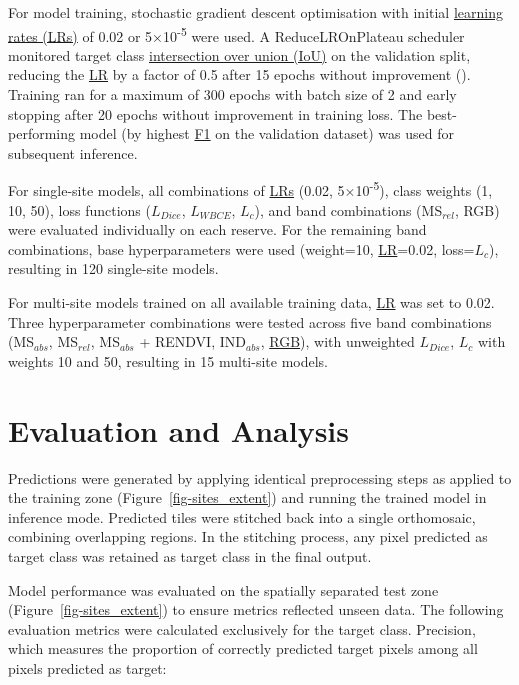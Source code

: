 \documentclass[
]{scrreprt}
\begin{document}
For model training, stochastic gradient descent optimisation with
initial \hyperref[acronyms_LR]{learning rates (LRs)} of 0.02 or
5×10\textsuperscript{-5} were used. A ReduceLROnPlateau scheduler
monitored target class \hyperref[acronyms_IoU]{intersection over
union (IoU)} on the validation split, reducing the
\hyperref[acronyms_LR]{LR} by a factor of 0.5 after 15 epochs without
improvement (). Training ran for a maximum of 300 epochs with batch size
of 2 and early stopping after 20 epochs without improvement in training
loss. The best-performing model (by highest \hyperref[acronyms_F1]{F1}
on the validation dataset) was used for subsequent inference.

For single-site models, all combinations of \hyperref[acronyms_LR]{LRs}
(0.02, 5×10\textsuperscript{-5}), class weights (1, 10, 50), loss
functions (\hyperref[acronyms_DICE]{\(L_{Dice}\)},
\hyperref[acronyms_WBCE]{\(L_{WBCE}\)},
\hyperref[acronyms_WBCE_D]{\(L_{c}\)}), and band combinations
(MS\(_{rel}\), RGB) were evaluated individually on each reserve. For the
remaining band combinations, base hyperparameters were used (weight=10,
\hyperref[acronyms_LR]{LR}=0.02,
loss=\hyperref[acronyms_WBCE_D]{\(L_{c}\)}), resulting in 120
single-site models.

For multi-site models trained on all available training data,
\hyperref[acronyms_LR]{LR} was set to 0.02. Three hyperparameter
combinations were tested across five band combinations (MS\(_{abs}\),
MS\(_{rel}\), MS\(_{abs}\) + RENDVI, IND\(_{abs}\),
\hyperref[acronyms_RGB]{RGB}), with unweighted
\hyperref[acronyms_DICE]{\(L_{Dice}\)},
\hyperref[acronyms_WBCE_D]{\(L_{c}\)} with weights 10 and 50, resulting
in 15 multi-site models.

\section{Evaluation and Analysis}\label{evaluation-and-analysis}

Predictions were generated by applying identical preprocessing steps as
applied to the training zone (Figure~\ref{fig-sites_extent}) and running
the trained model in inference mode. Predicted tiles were stitched back
into a single orthomosaic, combining overlapping regions. In the
stitching process, any pixel predicted as target class was retained as
target class in the final output.

Model performance was evaluated on the spatially separated test zone
(Figure~\ref{fig-sites_extent}) to ensure metrics reflected unseen data.
The following evaluation metrics were calculated exclusively for the
target class. Precision, which measures the proportion of correctly
predicted target pixels among all pixels predicted as target:
\end{document}
